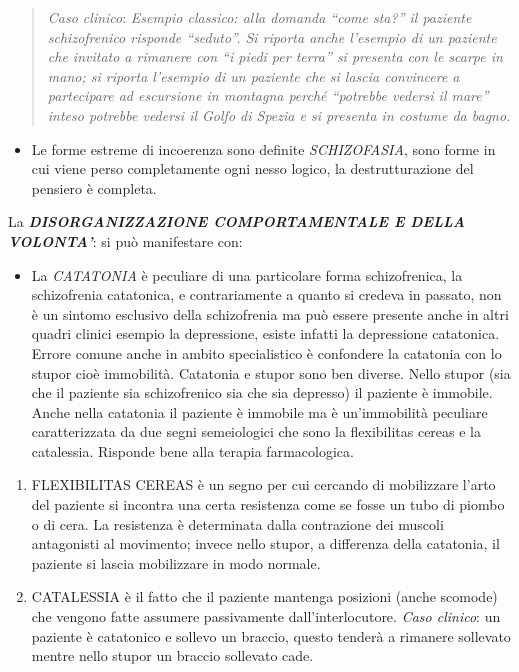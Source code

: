 \documentclass[]{article}
\begin{document}
\begin{quote}
\emph{Caso clinico}: \emph{Esempio classico: alla domanda ``come sta?''
il paziente schizofrenico risponde ``seduto''. Si riporta anche
l'esempio di un paziente che invitato a rimanere con ``i piedi per
terra'' si presenta con le scarpe in mano; si riporta l'esempio di un
paziente che si lascia convincere a partecipare ad escursione in
montagna perché ``potrebbe vedersi il mare'' inteso potrebbe vedersi il
Golfo di Spezia e si presenta in costume da bagno. }
\end{quote}

\begin{itemize}
\item
  Le forme estreme di incoerenza sono definite \emph{SCHIZOFASIA}, sono
  forme in cui viene perso completamente ogni nesso logico, la
  destrutturazione del pensiero è completa.
\end{itemize}

La \textbf{\emph{DISORGANIZZAZIONE COMPORTAMENTALE E DELLA VOLONTA'}}:
si può manifestare con:

\begin{itemize}
\item
  La \emph{CATATONIA} è peculiare di una particolare forma
  schizofrenica, la schizofrenia catatonica, e contrariamente a quanto
  si credeva in passato, non è un sintomo esclusivo della schizofrenia
  ma può essere presente anche in altri quadri clinici esempio la
  depressione, esiste infatti la depressione catatonica. Errore comune
  anche in ambito specialistico è confondere la catatonia con lo stupor
  cioè immobilità. Catatonia e stupor sono ben diverse. Nello stupor
  (sia che il paziente sia schizofrenico sia che sia depresso) il
  paziente è immobile. Anche nella catatonia il paziente è immobile ma è
  un'immobilità peculiare caratterizzata da due segni semeiologici che
  sono la flexibilitas cereas e la catalessia. Risponde bene alla
  terapia farmacologica.
\end{itemize}

\begin{enumerate}
\def\labelenumi{\arabic{enumi}.}
\item
  FLEXIBILITAS CEREAS è un segno per cui cercando di mobilizzare l'arto
  del paziente si incontra una certa resistenza come se fosse un tubo di
  piombo o di cera. La resistenza è determinata dalla contrazione dei
  muscoli antagonisti al movimento; invece nello stupor, a differenza
  della catatonia, il paziente si lascia mobilizzare in modo normale.
\item
  CATALESSIA è il fatto che il paziente mantenga posizioni (anche
  scomode) che vengono fatte assumere passivamente dall'interlocutore.
  \emph{Caso clinico}: un paziente è catatonico e sollevo un braccio,
  questo tenderà a rimanere sollevato mentre nello stupor un braccio
  sollevato cade.
\end{enumerate}
\end{document}
